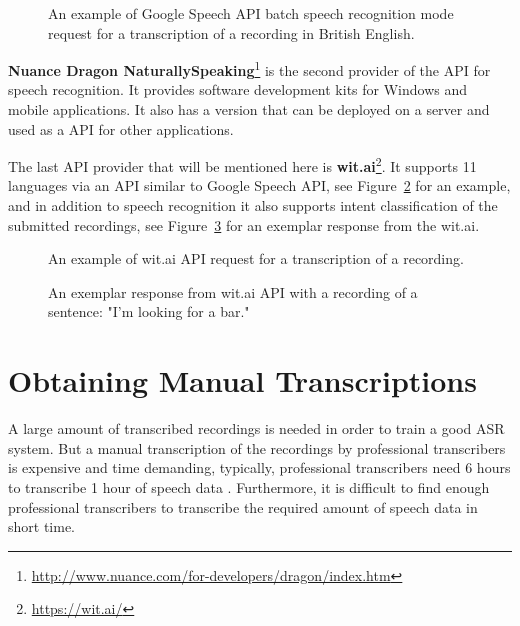 \begin{figure}[h]
  

  \caption{An example of Google Speech API batch speech recognition mode request for a transcription of a recording in British English.}
  \label{fig:google-api}
\end{figure}


\textbf{Nuance Dragon NaturallySpeaking}\footnote{\url{http://www.nuance.com/for-developers/dragon/index.htm}}
  is the second provider of the API for speech recognition.
It provides software development kits for Windows and mobile applications.
It also has a version that can be deployed on a server and used as a API for other applications.

The last API provider that will be mentioned here is \textbf{wit.ai}\footnote{\url{https://wit.ai/}}.
It supports 11 languages via an API similar to Google Speech API, see Figure~\ref{fig:wit-ai-request} for an example,
  and in addition to speech recognition it also supports intent classification of the submitted recordings,
  see Figure~\ref{fig:wit-ai-response} for an exemplar response from the wit.ai.

\begin{figure}[h]
  

  \caption{An example of wit.ai API request for a transcription of a recording.}
  \label{fig:wit-ai-request}
\end{figure}

\begin{figure}[h]
  

  \caption{An exemplar response from wit.ai API with a recording of a sentence: "I'm looking for a bar."}
  \label{fig:wit-ai-response}
\end{figure}


\section{Obtaining Manual Transcriptions}
A large amount of transcribed recordings is needed in order to train a good ASR system.
But a manual transcription of the recordings by professional transcribers is expensive and time demanding,
  typically, professional transcribers need 6 hours to transcribe 1 hour of speech data \cite{williams2011crowd}.
Furthermore, it is difficult to find enough professional transcribers to transcribe the required amount of speech data in short time.

